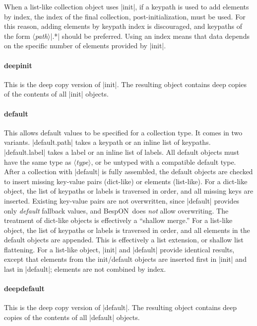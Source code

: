 \documentclass[11pt]{article}
\newcommand{\bespon}{BespON}
\newcommand{\vmeta}[1]{{\color{DarkRed}\ensuremath{\langle}\textit{#1}\ensuremath{\rangle}}}
\begin{document}
{{When a list-like collection object uses |init|, if a keypath is used to add elements by index, the index of the final collection, post-initialization, must be used.  For this reason, adding elements by keypath index is discouraged, and keypaths of the form \vmeta{path}|.*| should be preferred.  Using an index means that data depends on the specific number of elements provided by |init|.


\paragraph{deepinit}

This is the deep copy version of |init|.  The resulting object contains deep copies of the contents of all |init| objects.


\paragraph{default}

This allows default values to be specified for a collection type.  It comes in two variants. |default.path| takes a keypath or an inline list of keypaths.  |default.label| takes a label or an inline list of labels.  All default objects must have the same type as \vmeta{type}, or be untyped with a compatible default type.  After a collection with |default| is fully assembled, the default objects are checked to insert missing key-value pairs (dict-like) or elements (list-like).  For a dict-like object, the list of keypaths or labels is traversed in order, and all missing keys are inserted.  Existing key-value pairs are not overwritten, since |default| provides only \emph{default} fallback values, and \bespon\ does \emph{not} allow overwriting.  The treatment of dict-like objects is effectively a ``shallow merge.''  For a list-like object, the list of keypaths or labels is traversed in order, and all elements in the default objects are appended.  This is effectively a list extension, or shallow list flattening.  For a list-like object, |init| and |default| provide identical results, except that elements from the init/default objects are inserted first in |init| and last in |default|; elements are not combined by index.


\paragraph{deepdefault}

This is the deep copy version of |default|.  The resulting object contains deep copies of the contents of all |default| objects.


}}
\end{document}
